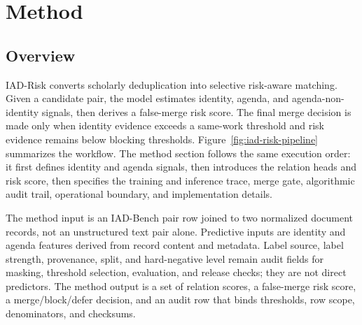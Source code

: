 \documentclass[preprint,12pt]{elsarticle}
\begin{document}
\section{Method}

\subsection{Overview}

IAD-Risk converts scholarly deduplication into selective risk-aware matching. Given a candidate pair, the model estimates identity, agenda, and agenda-non-identity signals, then derives a false-merge risk score. The final merge decision is made only when identity evidence exceeds a same-work threshold and risk evidence remains below blocking thresholds. Figure~\ref{fig:iad-risk-pipeline} summarizes the workflow. The method section follows the same execution order: it first defines identity and agenda signals, then introduces the relation heads and risk score, then specifies the training and inference trace, merge gate, algorithmic audit trail, operational boundary, and implementation details.

The method input is an IAD-Bench pair row joined to two normalized document records, not an unstructured text pair alone. Predictive inputs are identity and agenda features derived from record content and metadata. Label source, label strength, provenance, split, and hard-negative level remain audit fields for masking, threshold selection, evaluation, and release checks; they are not direct predictors. The method output is a set of relation scores, a false-merge risk score, a merge/block/defer decision, and an audit row that binds thresholds, row scope, denominators, and checksums.
\end{document}
